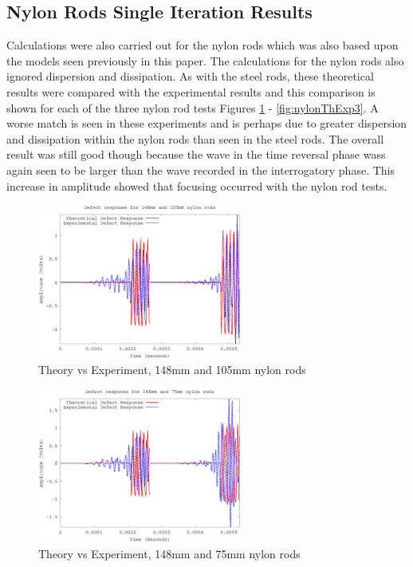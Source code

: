  \subsection{Nylon Rods Single Iteration Results}
 Calculations were also carried out for the nylon rods which was also based upon the models seen previously in this paper. The calculations for the nylon rods also ignored dispersion and dissipation. As with the steel rods, these theoretical results were compared with the experimental results and this comparison is shown for each of the three nylon rod tests Figures \ref{fig:nylonThExp1} - \ref{fig:nylonThExp3}. A worse match is seen in these experiments and is perhaps due to greater dispersion and dissipation within the nylon rods than seen in the steel rods. The overall result was still good though because the wave in the time reversal phase wass again seen to be larger than the wave recorded in the interrogatory phase. This increase in amplitude showed that focusing occurred with the nylon rod tests. 
 
 \begin{figure}[ht!]
 \centering
 \includegraphics[width=0.6\textwidth]{eps_pics/nylon-2-3_Iter_th_exp.eps}
 \caption{Theory vs Experiment, 148mm and 105mm nylon rods
 	 \label{fig:nylonThExp1}} 
 \end{figure}
 
 \begin{figure}[ht!]
 \centering
 \includegraphics[width=0.6\textwidth]{eps_pics/nylon-2-4_Iter_th_exp.eps}
 \caption{Theory vs Experiment, 148mm and 75mm nylon rods
 	 \label{fig:nylonThExp2}} 
 \end{figure}
 
